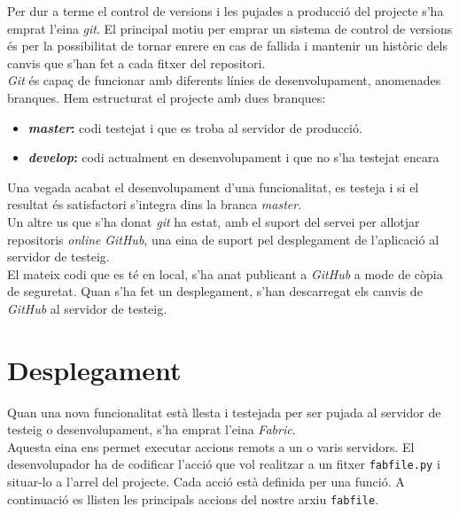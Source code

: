 Per dur a terme el control de versions i les pujades a producció del projecte s'ha emprat l'eina \emph{git}. El principal motiu per emprar un sistema de control de versions és per la possibilitat de tornar enrere en cas de fallida i mantenir un històric dels canvis que s'han fet a cada fitxer del repositori.\\

\emph{Git} és capaç de funcionar amb diferents línies de desenvolupament, anomenades branques. Hem estructurat el projecte amb dues branques:

\begin{itemize}
	\item \textbf{\emph{master}:} codi testejat i que es troba al servidor de producció.
	\item \textbf{\emph{develop}:} codi actualment en desenvolupament i que no s'ha testejat encara
\end{itemize}

Una vegada acabat el desenvolupament d'una funcionalitat, es testeja i si el resultat és satisfactori s'integra dins la branca \emph{master}.\\

Un altre us que s'ha donat \emph{git} ha estat, amb el suport del servei per allotjar repositoris \emph{online} \emph{GitHub}, una eina de suport pel desplegament de l'aplicació al servidor de testeig.\\

El mateix codi que es té en local, s'ha anat publicant a \emph{GitHub} a mode de còpia de seguretat. Quan s'ha fet un desplegament, s'han descarregat els canvis de \emph{GitHub} al servidor de testeig.

\section{Desplegament}

Quan una nova funcionalitat està llesta i testejada per ser pujada al servidor de testeig o desenvolupament, s'ha emprat l'eina \emph{Fabric}. \\

Aquesta eina ens permet executar accions remots a un o varis servidors. El desenvolupador ha de codificar l'acció que vol realitzar a un fitxer \texttt{fabfile.py} i situar-lo a l'arrel del projecte. Cada acció està definida per una funció. A continuació es llisten les principals accions del nostre arxiu \texttt{fabfile}.

